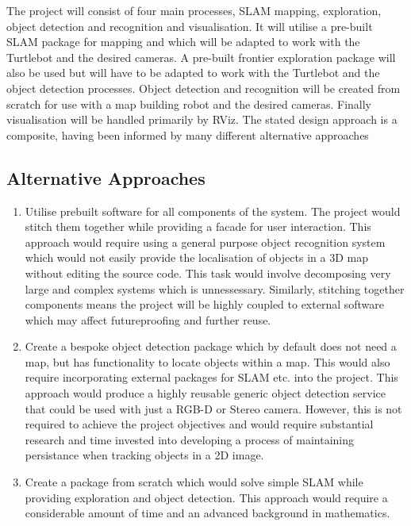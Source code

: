 \documentclass{mproj}
\begin{document}
The project will consist of four main processes, SLAM mapping, exploration, object detection and recognition and visualisation. It will utilise a pre-built SLAM package for mapping and which will be adapted to work with the Turtlebot and the desired cameras. A pre-built frontier exploration package will also be used but will have to be adapted to work with the Turtlebot and the object detection processes. Object detection and recognition will be created from scratch for use with a map building robot and the desired cameras. Finally visualisation will be handled primarily by RViz. The stated design approach is a composite, having been informed by many different alternative approaches

\subsection{Alternative Approaches}

\begin{enumerate}
\item Utilise prebuilt software for all components of the system. The project would stitch them together while providing a facade for user interaction. This approach would require using a general purpose object recognition system which would not easily provide the localisation of objects in a 3D map without editing the source code. This task would involve decomposing very large and complex systems which is unnessessary. Similarly, stitching together components means the project will be highly coupled to external software which may affect futureproofing and further reuse.
\item Create a bespoke object detection package which by default does not need a map, but has functionality to locate objects within a map. This would also require incorporating external packages for SLAM etc. into the project. This approach would produce a highly reusable generic object detection service that could be used with just a RGB-D or Stereo camera. However, this is not required to achieve the project objectives and would require substantial research and time invested into developing a process of maintaining  persistance when tracking objects in a 2D image.
\item Create a package from scratch which would solve simple SLAM while providing exploration and object detection. This approach  would require a considerable amount of time and an advanced background in mathematics.
\end{enumerate}
\end{document}
